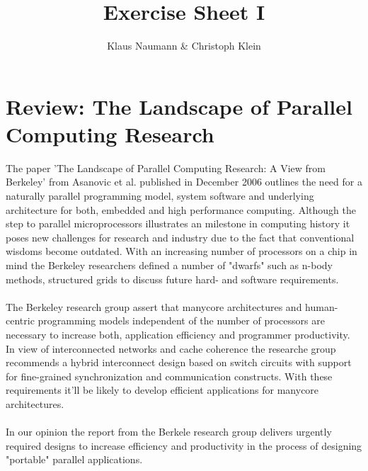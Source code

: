 \documentclass[DIV=12,oneside,a4paper]{scrartcl}
\begin{document}

\title{Exercise Sheet I}
\subject{Advanced Parallel Computing}
\author{Klaus Naumann \& Christoph Klein}
\maketitle




\section{Review: The Landscape of Parallel Computing Research}
The paper 'The Landscape of Parallel Computing Research: A View from Berkeley' 
from Asanovic et al. published in December 2006 outlines the need for a naturally
parallel programming model, system software and underlying architecture for both,
embedded and high performance computing. Although the step to parallel microprocessors 
illustrates an milestone in computing history it poses new challenges for research and 
industry due to the fact that conventional wisdoms become outdated. With an increasing
number of processors on a chip in mind the Berkeley researchers defined a number of
"dwarfs" such as n-body methods, structured grids to discuss future hard- and software
requirements. \\ \\
The Berkeley research group assert that manycore architectures and human-centric 
programming models independent of the number of processors are necessary to increase
both, application efficiency and programmer productivity. In view of interconnected 
networks and cache coherence the researche group recommends a hybrid interconnect design
based on switch circuits with support for fine-grained synchronization and communication
constructs. With these requirements it'll be likely to develop efficient applications
for manycore architectures. \\ \\
In our opinion the report from the Berkele research group delivers urgently required 
designs to increase efficiency and productivity in the process of designing "portable"
parallel applications.
       


\end{document}
